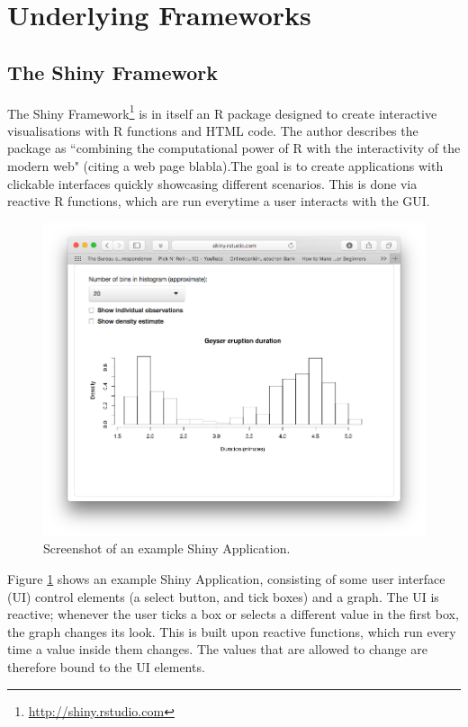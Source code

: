 \documentclass[12pt]{article} %
\begin{document}
\section{Underlying Frameworks}

\subsection{The Shiny Framework}

The Shiny Framework\footnote{\url{http://shiny.rstudio.com}} is in itself an R package designed to create interactive visualisations with R functions and HTML code. The author describes the package as ``combining the computational power of R with the interactivity of the modern web" (citing a web page blabla).The goal is to create applications with clickable interfaces quickly showcasing different scenarios. This is done via reactive R functions, which are run everytime a user interacts with the GUI. 

\begin{figure}[h]
\begin{centering}
\includegraphics[scale = 0.5, trim = 50 50 50 100]{figures/example_shiny_app.png}
\caption{Screenshot of an example Shiny Application.}
\label{exampleapp}
\end{centering}
\end{figure}

Figure \ref{exampleapp} shows an example Shiny Application, consisting of some user interface (UI) control elements (a select button, and tick boxes) and a graph. The UI is reactive; whenever the user ticks a box or selects a different value in the first box, the graph changes its look. This is built upon reactive functions, which run every time a value inside them changes. The values that are allowed to change are therefore bound to the UI elements.
\end{document}
